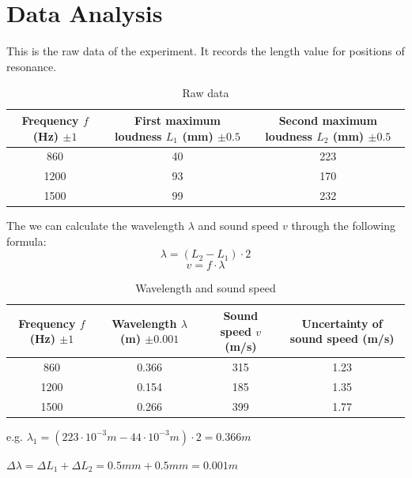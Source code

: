 \documentclass[15pt]{article}
\begin{document}
\section{Data Analysis}
This is the raw data of the experiment. It records the length value for positions of resonance.
\begin{table}[H]
\begin{tabular}{|c|c|c|}
\hline
Frequency $f$ (Hz) $\pm 1$ & First maximum loudness $L_1$ (mm) $\pm 0.5$ & Second maximum loudness $L_2$ (mm) $\pm 0.5$ \\ \hline
860                        & 40                                          & 223                                          \\ \hline
1200                       & 93                                          & 170                                          \\ \hline
1500                       & 99                                          & 232                                          \\ \hline
\end{tabular}
\caption{Raw data}
\end{table}

The we can calculate the wavelength $\lambda$ and sound speed $v$ through the following formula:
$$\lambda=(L_2-L_1) \cdot 2$$
$$v=f \cdot \lambda$$

\begin{table}[H]
\begin{tabular}{|c|c|c|c|}
\hline
Frequency $f$ (Hz) $\pm 1$ & Wavelength $\lambda$ (m) $\pm 0.001$ & Sound speed $v$ (m/s) & Uncertainty of sound speed (m/s) \\ \hline
860                        & 0.366                                & 315                   & 1.23                             \\ \hline
1200                       & 0.154                                & 185                   & 1.35                             \\ \hline
1500                       & 0.266                                & 399                   & 1.77                             \\ \hline
\end{tabular}
\centering
\caption{Wavelength and sound speed}
\end{table}

\noindent e.g. $\lambda_1=(223 \cdot 10^{-3}m-44 \cdot 10^{-3}m) \cdot 2=0.366m$

$\Delta \lambda=\Delta L_1+\Delta L_2=0.5mm+0.5mm=0.001m$
\end{document}

